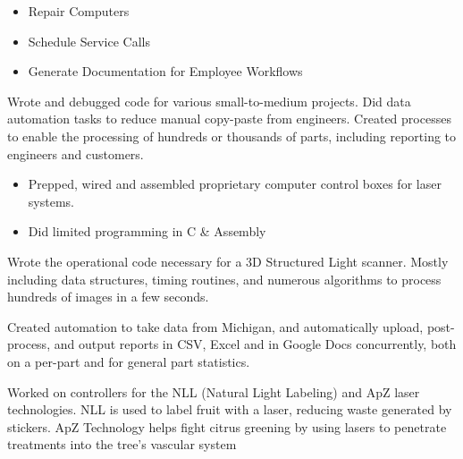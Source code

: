 \documentclass[10pt,letterpaper,ragged2e,withhyper]{altacv}
\begin{document}
\begin{paracol}{2}

\begin{itemize}
\item Repair Computers
\item Schedule Service Calls
\item Generate Documentation for Employee Workflows
\end{itemize}

Wrote and debugged code for various small-to-medium projects.
Did data automation tasks to reduce manual copy-paste from engineers.
Created processes to enable the processing of hundreds or thousands of parts,
including reporting to engineers and customers.

\begin{itemize}
\item Prepped, wired and assembled proprietary computer control boxes for laser systems.
\item Did limited programming in C \& Assembly
\end{itemize}


Wrote the operational code necessary for a 3D Structured Light scanner.
Mostly including data structures, timing routines, and numerous algorithms
to process hundreds of images in a few seconds.

Created automation to take data from Michigan,
and automatically upload, post-process, and output reports in CSV,
Excel and in Google Docs concurrently, both on a per-part and for
general part statistics.

Worked on controllers for the NLL (Natural Light Labeling) and ApZ laser technologies.
NLL is used to label fruit with a laser, reducing waste generated by stickers.
ApZ Technology helps fight citrus greening by using lasers to penetrate treatments into the tree’s vascular system



\end{paracol}
\end{document}
